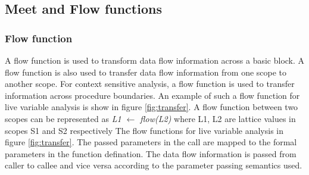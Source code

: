 \documentclass[12pt]{report}
\begin{document}
\subsection{Meet and Flow functions}

\subsubsection {Flow function}
A flow function is used to transform data flow information across a basic block. A flow function is also used to transfer data flow information from one scope to another scope. For context sensitive analysis, a flow function is used to transfer information across procedure boundaries. An example of such a flow function for live variable analysis is show in figure \ref{fig:transfer}. A flow function between two scopes can be represented as
\newline
\newline
\emph{L1 $\leftarrow$ flow(L2)}
\newline
where L1, L2 are lattice values in scopes S1 and S2 respectively
\newline
\newline
The flow functions for live variable analysis in figure \ref{fig:transfer}. The passed parameters in the call are mapped to the formal parameters in the function defination. The data flow information is passed from caller to callee and vice versa according to the parameter passing semantics used.  
\end{document}

